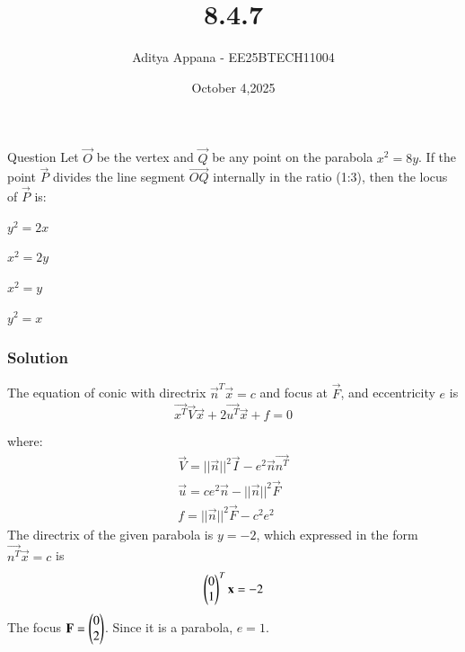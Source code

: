 \documentclass{beamer}
\title %
{8.4.7}
\date{October 4,2025}
\author %
{Aditya Appana - EE25BTECH11004}
\begin{document}
\frame{\titlepage}
\begin{frame}{Question}
Let $\vec{O}$ be the vertex and $\vec{Q}$ be any point on the parabola $x^2 = 8y$. If the point $\vec{P}$ divides the line segment $\vec{OQ}$ internally in the ratio (1:3), then the locus of $\vec{P}$ is:
\begin{enumerate}
\begin{multicols}{4}
    \item $y^2 = 2x$
    \item $x^2 = 2y$
    \item $x^2 = y$
    \item $y^2 = x$
    \end{multicols}
\end{enumerate}
\end{frame}



\begin{frame}[fragile]
    \frametitle{Solution}
The equation of conic with directrix $\vec{n}^T\vec{x} = c$ and focus at $\vec{F}$, and eccentricity $e$ is
$$ \vec{x^T}\vec{V}\vec{x} + 2\vec{u^T}\vec{x} + f = 0$$

where:
\begin{align*}
    \vec{V} = ||\vec{n}||^2\vec{I} - e^2\vec{n}\vec{n^T}\\
    \vec{u} = ce^2\vec{n} - ||\vec{n}||^2\vec{F}\\
    f=||\vec{n}||^2\vec{F} - c^2e^2
\end{align*}
The directrix of the given parabola is $y=-2$, which expressed in the form $\vec{n^T}\vec{x} = c$ is $$\begin{pmatrix}0\\1\end{pmatrix}^T\mathbf{x} = -2$$
The focus $\mathbf{F} = \begin{pmatrix}0\\2\end{pmatrix}$. Since it is a parabola, $e=1$.
\end{frame}
\end{document}
